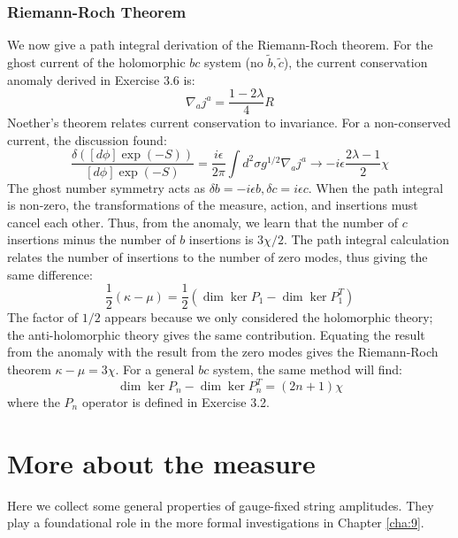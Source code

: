 \subsubsection*{\Large Riemann-Roch Theorem}
We now give a path integral derivation of the Riemann-Roch theorem. For the ghost current of the holomorphic $bc$ system (no $\tilde{b}, \tilde{c}$), the current conservation anomaly derived in Exercise 3.6 is:
\begin{equation}
	\nabla_{a} j^{a}=\frac{1-2 \lambda}{4} R
\end{equation}
Noether's theorem relates current conservation to invariance. For a non-conserved current, the discussion found:
\begin{equation}
	\frac{\delta([d \phi] \exp (-S))}{[d \phi] \exp (-S)}=\frac{i \epsilon}{2 \pi} \int d^{2} \sigma g^{1 / 2} \nabla_{a} j^{a} \rightarrow-i \epsilon \frac{2 \lambda-1}{2} \chi
\end{equation}
The ghost number symmetry acts as $\delta b = -i \epsilon b, \delta c = i \epsilon c$. When the path integral is non-zero, the transformations of the measure, action, and insertions must cancel each other. Thus, from the anomaly, we learn that the number of $c$ insertions minus the number of $b$ insertions is $3\chi/2$. The path integral calculation relates the number of insertions to the number of zero modes, thus giving the same difference:
\begin{equation}
	\frac{1}{2}(\kappa-\mu)=\frac{1}{2}\left(\operatorname{dim} \operatorname{ker} P_{1}-\operatorname{dim} \operatorname{ker} P_{1}^{T}\right)
\end{equation}
The factor of $1/2$ appears because we only considered the holomorphic theory; the anti-holomorphic theory gives the same contribution. Equating the result from the anomaly with the result from the zero modes gives the Riemann-Roch theorem $\kappa-\mu=3\chi$. For a general $bc$ system, the same method will find:
\begin{equation}
	\operatorname{dim} \operatorname{ker} P_{n}-\operatorname{dim} \operatorname{ker} P_{n}^{T}=(2 n+1) \chi
\end{equation}
where the $P_n$ operator is defined in Exercise 3.2.

\section{More about the measure}
Here we collect some general properties of gauge-fixed string amplitudes. They play a foundational role in the more formal investigations in Chapter \ref{cha:9}.


